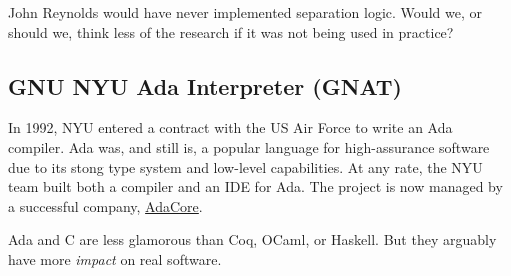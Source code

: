John Reynolds would have never implemented separation logic.
Would we, or should we, think less of the research if it was not being used in practice?


\subsection{GNU NYU Ada Interpreter (GNAT)}

In 1992, NYU entered a contract with the US Air Force to write an Ada compiler.
Ada was, and still is, a popular language for high-assurance software due to its stong type system and low-level capabilities.
At any rate, the NYU team built both a compiler and an IDE for Ada.
The project is now managed by a successful company, \href{http://www.adacore.com/}{AdaCore}.

Ada and C are less glamorous than Coq, OCaml, or Haskell.
But they arguably have more \emph{impact} on real software.
